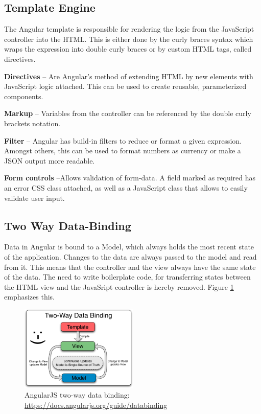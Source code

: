 \subsection{Template Engine}
The Angular template is responsible for rendering the logic from the JavaScript controller into the HTML. This is either done by the curly braces syntax which wraps the expression into double curly braces or by custom HTML tags, called directives.\vspace{1ex}

\noindent\textbf{Directives} -- Are Angular's method of extending HTML by new elements with JavaScript logic attached. This can be used to create reusable, parameterized components.\vspace{1ex}

\noindent\textbf{Markup} -- Variables from the controller can be referenced by the double curly brackets notation.\vspace{1ex}

\noindent\textbf{Filter} -- Angular has build-in filters to reduce or format a given expression. Amongst others, this can be used to format numbers as currency or make a JSON output more readable.\vspace{1ex}

\noindent\textbf{Form controls} --Allows validation of form-data. A field marked as required has an error CSS class attached, as well as a JavaScript class that allows to easily validate user input.


\subsection{Two Way Data-Binding}
\label{sec:tw-binding}
Data in Angular is bound to a Model, which always holds the most recent state of the application. Changes to the data are always passed to the model and read from it. This means that the controller and the view always have the same state of the data. The need to write boilerplate code, for transferring states between the HTML view and the JavaSript controller is hereby removed. Figure \ref{fig:tw-databinding} emphasizes this.

\begin{figure}[H]
	\centering\includegraphics[width=0.5\textwidth]{res/Two_Way_Data_Binding}
	\caption{AngularJS two-way data binding: \url{https://docs.angularjs.org/guide/databinding}}
	\label{fig:tw-databinding}
\end{figure}


